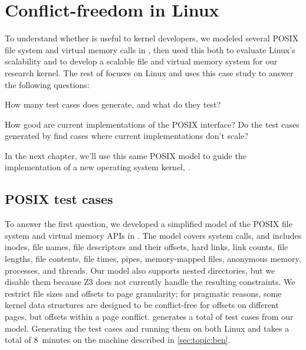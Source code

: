 \section{Conflict-freedom in Linux}
\label{sec:linux}
\label{sec:topic:model}


To understand whether \tool{} is useful to kernel developers,
we modeled several POSIX file system and virtual memory calls in \tool,
then used this both to evaluate Linux's scalability and to develop a
scalable file and virtual memory system for our \sys research kernel.
%
The rest of  focuses on Linux and uses this case study to
answer the following questions:

\begin{CompactItemize}

\item How many test cases does \tool{} generate, and what do they test?

\item How good are current implementations of the POSIX interface?
      Do the test cases generated by \tool{} find
      cases where current implementations don't scale?

\end{CompactItemize}

In the next chapter, we'll use this same POSIX model to guide the
implementation of a new operating system kernel, \sys.

\subsection{POSIX test cases}

To answer the first question, we developed a simplified model of the
POSIX file system and virtual memory APIs in \tool{}.  The model covers
 system
calls, and includes inodes, file
names, file descriptors and their offsets, hard links, link counts,
file lengths, file contents, file times, pipes, memory-mapped files,
anonymous memory, processes, and threads.  Our model
also supports nested
directories, but we disable them because Z3 does not currently handle
the resulting constraints.
%
We restrict file sizes and offsets to page granularity; for pragmatic
reasons, some kernel data structures are designed to be conflict-free
for offsets on different pages, but
offsets within a page conflict.
%
\tool generates a total of  test cases
from our model.
%
Generating the test cases and running them on both Linux and \sys
takes a total of 8~minutes on the machine described in
\cref{sec:topic:ben}.


